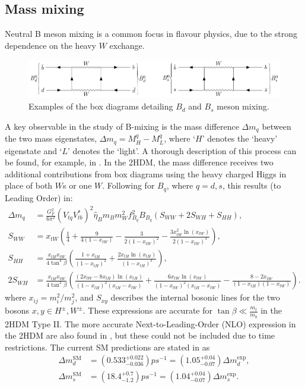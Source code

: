 \documentclass[a4paper,12pt]{article}
\begin{document}
\subsection{Mass mixing}
\label{subsec:mix}
Neutral B meson mixing is a common focus in flavour physics, due to the strong dependence on the heavy $W$ exchange. 
\begin{figure}[ht]
    \centering
    \includegraphics[scale=0.8,trim=12em 44.5em 8em 12em,clip]{bmix.pdf}
    \caption{\label{fig:bmix} Examples of the box diagrams detailing $B_d$ and $B_s$ meson mixing.}
\end{figure}
A key observable in the study of B-mixing is the mass difference $\Delta m_q$ between the two mass eigenstates, $\Delta m_q = M_H^q - M_L^q$, where `$H$' denotes the `heavy' eigenstate and `$L$' denotes the `light'. 
A thorough description of this process can be found, for example, in \cite{mix15}.
In the 2HDM, the mass difference receives two additional contributions from box diagrams using the heavy charged Higgs in place of both $W$s or one $W$. 
Following \cite{frank} for $B_q$, where $q=d,s$, this results (to Leading Order) in:
\begin{align}
    \Delta m_q &= \frac{G_F^2}{6\pi^2}(V_{tq}V_{tb}^*)^2\hat{\eta}_Bm_Bm_W^2f_{B_q}^2B_{B_q}(S_{WW}+2S_{WH}+S_{HH}), \\
    S_{WW} &= x_{tW}\left(\frac14+\frac{9}{4(1-x_{tW})}-\frac{3}{2(1-x_{tW})^2}-\frac{3x_{tW}^2\ln(x_{tW})}{2(1-x_{tW})^3}\right), \\
    S_{HH} &= \frac{x_{tH}x_{tW}}{4\tan^4\beta}\left(\frac{1+x_{tH}}{(1-x_{tH})^2}+\frac{2x_{tH}\ln(x_{tH})}{(1-x_{tH})^3}\right),\\
    2S_{WH} &= \frac{x_{tH}x_{tW}}{4\tan^2\beta}\left(\frac{(2x_{tW}-8x_{tH})\ln(x_{tH})}{(1-x_{tH})^2(x_{tH}-x_{tW})}+\frac{6x_{tW}\ln(x_{tW})}{(1-x_{tW})^2(x_{tH}-x_{tW})}-\frac{8-2x_{tW}}{(1-x_{tH})(1-x_{tW})}\right).
\end{align}
where $x_{ij} = m_i^2/m_j^2$, and $S_{xy}$ describes the internal bosonic lines for the two bosons $x,y \in H^\pm,W^\pm$.
These expressions are accurate for $\tan\beta\ll\frac{m_t}{m_b}$ in the 2HDM Type II.
The more accurate Next-to-Leading-Order (NLO) expression in the 2HDM are also found in \cite{frank}, but these could not be included due to time restrictions.
The current SM predictions are stated in \cite{bmix} as
\begin{align}
    \Delta m^{\text{SM}}_d &= \left(0.533^{+0.022}_{-0.036}\right)ps^{-1} = \left(1.05^{+0.04}_{-0.07}\right)\Delta m_d^{\text{exp}}, \\
    \Delta m^{\text{SM}}_s &= \left(18.4^{+0.7}_{-1.2}\right)ps^{-1} = \left(1.04^{+0.04}_{-0.07}\right)\Delta m_s^{\text{exp}}.
\end{align}
\end{document}
